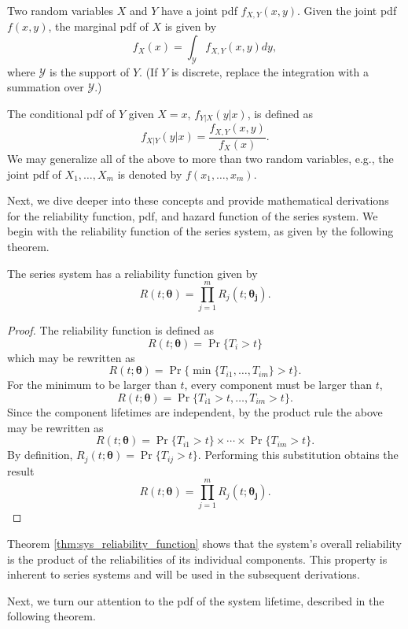 \documentclass[
]{article}
\begin{document}
Two random variables \(X\) and \(Y\) have a joint pdf \(f_{X,Y}(x,y)\).
Given the joint pdf \(f(x,y)\), the marginal pdf of \(X\) is given by \[
f_X(x) = \int_{\mathcal{Y}} f_{X,Y}(x,y) dy,
\] where \(\mathcal{Y}\) is the support of \(Y\). (If \(Y\) is discrete,
replace the integration with a summation over \(\mathcal{Y}\).)

The conditional pdf of \(Y\) given \(X=x\), \(f_{Y|X}(y|x)\), is defined
as \[
f_{X|Y}(y|x) = \frac{f_{X,Y}(x,y)}{f_X(x)}.
\] We may generalize all of the above to more than two random variables,
e.g., the joint pdf of \(X_1,\ldots,X_m\) is denoted by
\(f(x_1,\ldots,x_m)\).

Next, we dive deeper into these concepts and provide mathematical
derivations for the reliability function, pdf, and hazard function of
the series system. We begin with the reliability function of the series
system, as given by the following theorem.

\begin{theorem}
\label{thm:sys_reliability_function}
The series system has a reliability function given by
\begin{equation}
\label{eq:sys_reliability_function}
  R(t;\boldsymbol{\theta}) = \prod_{j=1}^m R_j(t;\boldsymbol{\theta_j}).
\end{equation}
\end{theorem}
\begin{proof}
The reliability function is defined as
$$
  R(t;\boldsymbol{\theta}) = \Pr\{T_i > t\}
$$
which may be rewritten as
$$
  R(t;\boldsymbol{\theta}) = \Pr\{\min\{T_{i 1},\ldots,T_{i m}\} > t\}.
$$
For the minimum to be larger than $t$, every component must be larger than $t$,
$$
  R(t;\boldsymbol{\theta}) = \Pr\{T_{i 1} > t,\ldots,T_{i m} > t\}.
$$
Since the component lifetimes are independent, by the product rule the above may
be rewritten as
$$
  R(t;\boldsymbol{\theta}) = \Pr\{T_{i 1} > t\} \times \cdots \times \Pr\{T_{i m} > t\}.
$$
By definition, $R_j(t;\boldsymbol{\theta}) = \Pr\{T_{i j} > t\}$.
Performing this substitution obtains the result
$$
  R(t;\boldsymbol{\theta}) = \prod_{j=1}^m R_j(t;\boldsymbol{\theta_j}).
$$
\end{proof}

Theorem \ref{thm:sys_reliability_function} shows that the system's
overall reliability is the product of the reliabilities of its
individual components. This property is inherent to series systems and
will be used in the subsequent derivations.

Next, we turn our attention to the pdf of the system lifetime, described
in the following theorem.
\end{document}
